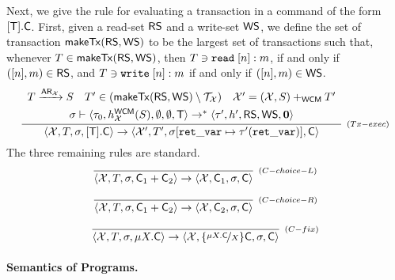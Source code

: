 \documentclass[a4paper,UKenglish]{article}%
\theoremstyle{plain}
\begin{document}
Next, we give the rule for evaluating a transaction in a command of the form $[\mathsf{T}].\mathsf{C}$. 
First, given a read-set $\mathsf{RS}$ and a write-set $\mathsf{WS}$, we define the set of transaction $\mathsf{makeTx}(\mathsf{RS},\mathsf{WS})$ 
to be the largest set of transactions such that, whenever $T \in \mathsf{makeTx}(\mathsf{RS}, \mathsf{WS})$, then $T \ni {{\tt read}}\;[n]:m$, if and only if $([n], m) \in \mathsf{RS}$, and $T \ni 
{{\tt write}}\;[n]:m$ if and only if $([n], m) \in \mathsf{WS}$. 
\[
\infer[{\scriptstyle{(Tx-exec)}}]{\langle \aexec, T, \thdstack, \TxOp{\Tx}.\Cmd \rangle \rightarrow 
\langle \aexec', T', \thdstack[\retvar \mapsto \txstack'(\retvar)], \Cmd \rangle}
{
\begin{array}{lll}T \xrightarrow{\AR_{\aexec}} S &  T' \in (\makeTx(\RS,\WS) \setminus \T_{\aexec}) & \aexec' = (\aexec, S) \aeplus_{\xspec} T'\\[4pt]
\multicolumn{3}{c}{\thdstack \vdash \langle \txstack_0, \heap_{\aexec}^{\xspec}(S), \emptyset, \emptyset, \Tx \rangle \rightarrow^\ast \langle \txstack', \heap', \RS, \WS, \nil \rangle}
\end{array}}
\]
The three remaining rules are standard.
\[
\infer[{\scriptstyle{(C-choice-L)}}]
{\langle \aexec, T, \thdstack, \Cmd_1 + \Cmd_2 \rangle \rightarrow \langle \aexec, \Cmd_1, \thdstack, \Cmd \rangle}
{} 
\]

\[
\infer[{\scriptstyle{(C-choice-R)}}]
{\langle \aexec, T, \thdstack, \Cmd_1 + \Cmd_2 \rangle \rightarrow \langle \aexec, \Cmd_2, \thdstack, \Cmd \rangle}
{} 
\]

\[
\infer[{\scriptstyle{(C-fix)}}]
{\langle \aexec, T, \thdstack, \mu X.\Cmd \rangle \rightarrow \langle \aexec, \{\nicefrac{\mu X.\Cmd}{X}\}\Cmd, \thdstack, \Cmd \rangle}
{} 
\]

\paragraph{\textbf{Semantics of Programs.}}



\end{document}
